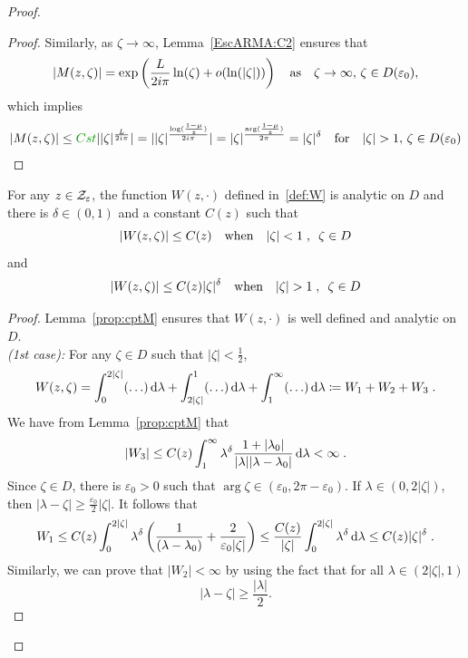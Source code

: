 \documentclass[11pt]{amsart}
\newcommand{\MD}{\color{vert}}
\newcommand{\diff}{\,\mathrm{d}}
\begin{document}
\begin{proof}
\begin{proof}
Similarly, as $\zeta \to \infty$, Lemma~\ref{EscARMA:C2} ensures that 
\begin{align*}
    |M(z, \zeta)| 
    = 
    \exp\left(\frac{L}{2i\pi } \ln(\zeta) + o(\ln(|\zeta|)) \right)  \quad \text{as} \quad \zeta\to \infty,\, \zeta \in D(\varepsilon_0),
\end{align*}
which implies 
$$ \vert {M(z,\zeta)}{} \vert \leq {\MD Cst }\vert {|\zeta|^{\frac{L}{2i\pi}}}\vert=
\vert |\zeta|^{\frac{\log(\frac{1-\mu}{z})}{2i\pi}}\vert = \vert \zeta \vert^{\frac{\arg (\frac{1-\mu}{z})}{2\pi}}=\vert \zeta \vert^\delta
\mtext{for}  \vert \zeta \vert > 1,\, \zeta \in D(\varepsilon_0)$$
\end{proof}

\begin{lemma}\label{lm:cptW}For any $z \in \mathcal{Z}_\varepsilon$, the function $W(z, \cdot)$ defined in~\eqref{def:W} is analytic on $D$ and there is $\delta \in (0,1)$ and a constant $C(z)$ such that
    $$ |W(z, \zeta)| \leq C(z) 
    \quad \text{when} \quad |\zeta| < 1 \; , \enspace \zeta \in D$$
    and 
    $$ |W(z, \zeta)| \leq C(z)|\zeta|^\delta \quad \text{when} \quad |\zeta| > 1 \; , \enspace \zeta \in D$$
\end{lemma}
\begin{proof}Lemma~\ref{prop:cptM} ensures that $W(z,\cdot)$ is well defined and analytic on $D$.\\

\textit{(1st case): }For any $\zeta \in D$ such that $|\zeta| < \frac{1}{2}$, 
\begin{align*}
    W(z, \zeta) = \int_0^{2|\zeta|} (\ldots)\diff \lambda + \int_{2|\zeta|}^1 (\ldots) \diff \lambda + \int_1^\infty (\ldots) \diff \lambda \coloneqq W_1 + W_2 + W_3 \eqfinp
\end{align*}
We have from Lemma~\ref{prop:cptM} that
    $$ |W_3| \leq C(z) \int_1^\infty \lambda^\delta \frac{1+|\lambda_0|}{|\lambda||\lambda - \lambda_0|} \diff \lambda < \infty \eqfinp$$
Since $\zeta \in D$, there is $\varepsilon_0 > 0$ such that $\arg \zeta \in (\varepsilon_0, 2\pi - \varepsilon_0)$. If $\lambda \in (0, 2|\zeta|)$, then $|\lambda-\zeta| \geq \frac{\varepsilon_0}{2}|\zeta|$. It follows that 
    $$ W_1 \leq C(z)\int_0^{2|\zeta|} \lambda^\delta \left(\frac{1}{(\lambda-\lambda_0)}+ \frac{2}{\varepsilon_0 |\zeta|}\right) \leq \frac{C(z)}{|\zeta|} \int_0^{2|\zeta|} \lambda^\delta \diff \lambda \leq C(z)|\zeta|^\delta \eqfinp$$
Similarly, we can prove that $|W_2| < \infty$ by using the fact that for all $\lambda \in (2|\zeta|, 1)$ $$|\lambda-\zeta|\geq\frac{|\lambda|}{2}.$$


\end{proof}
\end{proof}
\end{document}
